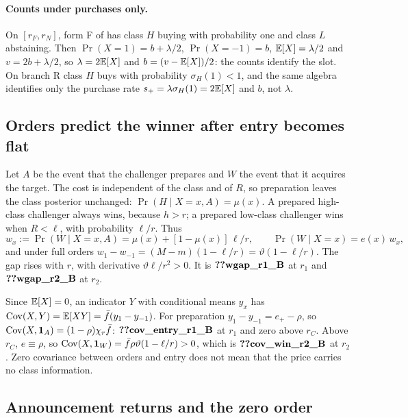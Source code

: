 \paragraph{Counts under purchases only.} On \([r_F,r_N]\), form F of  has class \(H\)
buying with probability one and class \(L\) abstaining. Then \(\Pr(X=1)=b+\lambda/2\), \(\Pr(X=-1)=b\),
\(\mathbb{E}[X]=\lambda/2\) and \(v=2b+\lambda/2\), so \(\lambda=2\mathbb{E}[X]\) and \(b=(v-\mathbb{E}[X])/2\): the counts identify the slot.
On branch R class \(H\) buys with probability \(\sigma_H(1)<1\), and the same algebra identifies only the purchase rate
\(s_+=\lambda\sigma_H(1)=2\mathbb{E}[X]\) and \(b\), not \(\lambda\).

\subsection{Orders predict the winner after entry becomes flat}\label{sec:12_empirical-winner}

Let \(A\) be the event that the challenger prepares and \(W\) the event that it acquires the target. The cost is
independent of the class and of \(R\), so preparation leaves the class posterior unchanged:
\(\Pr(H\mid X=x,A)=\mu(x)\). A prepared high-class challenger always wins, because \(h>r\); a prepared low-class
challenger wins when \(R<\ell\), with probability \(\ell/r\). Thus
\[
w_x:=\Pr(W\mid X=x,A)=\mu(x)+[1-\mu(x)]\,\ell/r,\qquad \Pr(W\mid X=x)=e(x)\,w_x,
\]
and under full orders \(w_1-w_{-1}=(M-m)(1-\ell/r)=\vartheta(1-\ell/r)\).
The gap rises with \(r\), with derivative \(\vartheta\ell/r^2>0\). It is \(\reg{wgap_r1_B}\) at \(r_1\) and
\(\reg{wgap_r2_B}\) at \(r_2\).

Since \(\mathbb{E}[X]=0\), an indicator \(Y\) with conditional means \(y_x\) has \(\operatorname{Cov}(X,Y)=\mathbb{E}[XY]=\bar f(y_1-y_{-1})\).
For preparation \(y_1-y_{-1}=e_+-\rho\), so \(\operatorname{Cov}(X,\mathbf{1}_A)=(1-\rho)\chi_r\bar f\): \(\reg{cov_entry_r1_B}\)
at \(r_1\) and zero above \(r_C\). Above \(r_C\), \(e\equiv\rho\), so \(\operatorname{Cov}(X,\mathbf{1}_W)=\bar f\rho\vartheta(1-\ell/r)>0\),
which is \(\reg{cov_win_r2_B}\) at \(r_2\). Zero covariance between orders and entry does not mean that the price carries
no class information.

\subsection{Announcement returns and the zero order}\label{sec:12_empirical-announcements}

